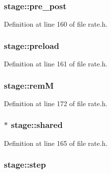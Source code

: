 \subsubsection[{\texorpdfstring{pre\+\_\+post}{pre_post}}]{ stage\+::pre\+\_\+post}\hypertarget{structstage_afc665050a65a6a1e6342270577cd404e}{}\label{structstage_afc665050a65a6a1e6342270577cd404e}


Definition at line 160 of file rate.\+h.

\subsubsection[{\texorpdfstring{preload}{preload}}]{ stage\+::preload}\hypertarget{structstage_a10b3cd32ce6ccf0386610f7b3fab415c}{}\label{structstage_a10b3cd32ce6ccf0386610f7b3fab415c}


Definition at line 161 of file rate.\+h.

\subsubsection[{\texorpdfstring{remM}{remM}}]{ stage\+::remM}\hypertarget{structstage_a6cec088be13e9f4651447cd82b73da98}{}\label{structstage_a6cec088be13e9f4651447cd82b73da98}


Definition at line 172 of file rate.\+h.

\subsubsection[{\texorpdfstring{shared}{shared}}]{$\ast$ stage\+::shared}\hypertarget{structstage_a07bca553ab88e98bf45e59c2a44119c8}{}\label{structstage_a07bca553ab88e98bf45e59c2a44119c8}


Definition at line 165 of file rate.\+h.

\subsubsection[{\texorpdfstring{step}{step}}]{ stage\+::step}\hypertarget{structstage_a79113b34a0789d5bb186a165fa72a12b}{}\label{structstage_a79113b34a0789d5bb186a165fa72a12b}


